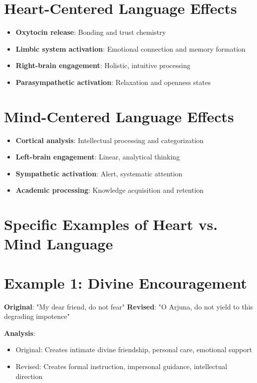 \documentclass[11pt,twoside]{book}
\begin{document}
\section*{Heart-Centered Language Effects}
\label{sec:org6d1244d}
\begin{itemize}
\item \textbf{\textbf{Oxytocin release}}: Bonding and trust chemistry
\item \textbf{\textbf{Limbic system activation}}: Emotional connection and memory formation
\item \textbf{\textbf{Right-brain engagement}}: Holistic, intuitive processing
\item \textbf{\textbf{Parasympathetic activation}}: Relaxation and openness states
\end{itemize}
\section*{Mind-Centered Language Effects}
\label{sec:org6e2e683}
\begin{itemize}
\item \textbf{\textbf{Cortical analysis}}: Intellectual processing and categorization
\item \textbf{\textbf{Left-brain engagement}}: Linear, analytical thinking
\item \textbf{\textbf{Sympathetic activation}}: Alert, systematic attention
\item \textbf{\textbf{Academic processing}}: Knowledge acquisition and retention
\end{itemize}
\section*{Specific Examples of Heart vs. Mind Language}
\label{sec:orgb91d77a}

\section*{Example 1: Divine Encouragement}
\label{sec:org42f9f7b}
\textbf{\textbf{Original}}: "My dear friend, do not fear"
\textbf{\textbf{Revised}}: "O Arjuna, do not yield to this degrading impotence"

\textbf{\textbf{Analysis}}: 
\begin{itemize}
\item Original: Creates intimate divine friendship, personal care, emotional support
\item Revised: Creates formal instruction, impersonal guidance, intellectual direction
\end{itemize}
\end{document}

